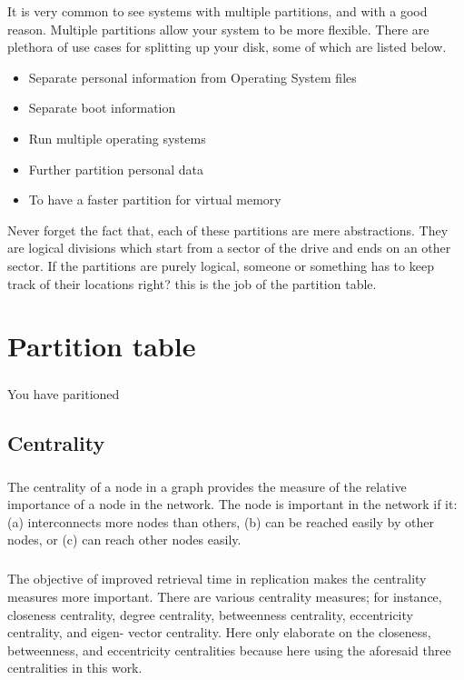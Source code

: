 It is very common to see systems with multiple partitions, and with a good
reason. Multiple partitions allow your system to be more flexible. There are
plethora of use cases for splitting up your disk, some of which are listed
below.

\begin{itemize}
    \item Separate personal information from Operating System files
    \item Separate boot information
    \item Run multiple operating systems
    \item Further partition personal data
    \item To have a faster partition for virtual memory
\end{itemize}

Never forget the fact that, each of these partitions are mere abstractions. They
are logical divisions which start from a sector of the drive and ends on an
other sector. If the partitions are purely logical, someone or something has to
keep track of their locations right? this is the job of the partition table.


\chapter{Partition table}
\paragraph{}
You have paritioned 


\section{Centrality}
\paragraph{}
The centrality of a node in a graph provides the measure of the relative importance
of a node in the network. The node is important in the network if it:
\newline (a) interconnects more nodes than others,
\newline (b) can be reached easily by other nodes, or 
\newline(c) can reach other nodes easily.
\paragraph{}
The objective of improved retrieval time in replication makes the centrality measures
more important. There are various centrality measures; for instance, closeness centrality,
degree centrality, betweenness centrality, eccentricity centrality, and eigen- vector centrality.
Here only elaborate on the closeness, betweenness, and eccentricity centralities because here
using the aforesaid three centralities in this work.
